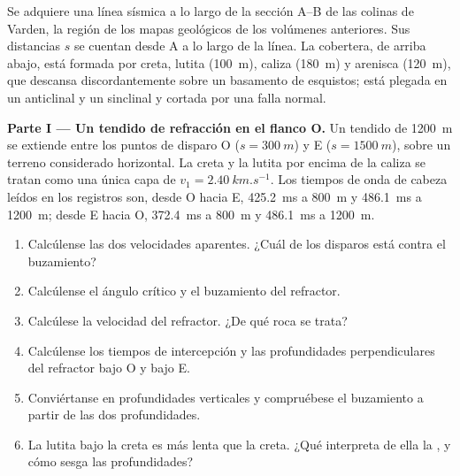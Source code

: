 \begin{problem}
\label{pb:b3:exploration-seismology:1}
Se adquiere una línea sísmica a lo largo de la sección A--B de las colinas de Varden, la región de
los mapas geológicos de los volúmenes anteriores. Sus distancias $s$ se cuentan desde
A a lo largo de la línea. La cobertera, de arriba abajo, está formada por creta, lutita (\qty{100}{m}),
caliza (\qty{180}{m}) y arenisca (\qty{120}{m}), que descansa discordantemente sobre
un basamento de esquistos; está plegada en un anticlinal y un sinclinal y cortada por una
falla normal.

\medskip
\noindent\textbf{Parte I --- Un tendido de refracción en el flanco O.} Un tendido de
\qty{1200}{m} se extiende entre los puntos de disparo O ($s = \qty{300}{m}$) y E
($s = \qty{1500}{m}$), sobre un terreno considerado horizontal. La creta y la lutita por encima de la
caliza se tratan como una única capa de $v_1 = \qty{2.40}{km.s^{-1}}$. Los
tiempos de onda de cabeza leídos en los registros son, desde O hacia E, \qty{425.2}{ms} a
\qty{800}{m} y \qty{486.1}{ms} a \qty{1200}{m}; desde E hacia O,
\qty{372.4}{ms} a \qty{800}{m} y \qty{486.1}{ms} a \qty{1200}{m}.
\begin{enumerate}
  \item Calcúlense las dos velocidades aparentes. ¿Cuál de los disparos está contra el buzamiento?
  \item Calcúlense el ángulo crítico y el buzamiento del refractor.
  \item Calcúlese la velocidad del refractor. ¿De qué roca se trata?
  \item Calcúlense los tiempos de intercepción y las profundidades perpendiculares del
        refractor bajo O y bajo E.
  \item Conviértanse en profundidades verticales y compruébese el buzamiento a partir de las dos profundidades.
  \item La lutita bajo la creta es más lenta que la creta. ¿Qué interpreta de ella la
        , y cómo sesga las profundidades?
\end{enumerate}


\end{problem}
